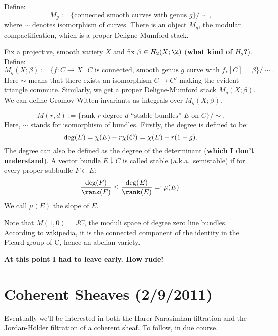 \documentclass[11pt]{article}
\newcommand{\NewLecture}[3]{\section{#1 {\small(#2/#3/2011)}}}
\begin{document}
\begin{exmp*}
Define:
\[M_g:=\{\text{connected smooth curves with genus $g$}\}/\sim,\]
where $\sim$ denotes isomorphism of curves. There is an object $\overline{M_g}$,
the modular compactification, which is a proper Deligne-Mumford stack.
\end{exmp*}
\begin{exmp*}
Fix a projective, smooth variety $X$ and fix $\beta\in H_2(X;\Z)$ (\textbf{what
kind of $H_2$?}). Define:
\[M_g(X;\beta):=\{f:C\to X\ |\ \text{$C$ is connected, smooth genus $g$ curve
with $f_*[C]=\beta$}\}/\sim.\]
Here $\sim$ means that there exists an isomorphism $C\to C'$ making the evident
triangle commute. Similarly, we get a proper Deligne-Mumford stack
$\overline{M_g(X;\beta)}$. We can define Gromov-Witten invariants as integrals
over $\overline{M_g(X;\beta)}$.
\end{exmp*}
\begin{exmp*}
\[M(r,d):=\{\text{rank $r$ degree $d$ ``stable bundles'' $E$ on $C$}\}/\sim.\]
Here, $\sim$ stands for isomorphism of bundles. Firstly, the degree is defined
to be:
\[\deg(E)=\chi(E)-r\chi(\mathcal{O})=\chi(E)-r(1-g).\]
The degree can also be defined as the degree of the determinant (\textbf{which I
don't understand}). A vector bundle $E\downarrow C$ is called stable (a.k.a.\
semistable) if for every proper subbudle $F\subset E$:
\[\frac{\deg(F)}{\rank(F)}\leq\frac{\deg(E)}{\rank(E)}=:\mu(E).\]
We call $\mu(E)$ the slope of $E$.

Note that $M(1,0)=JC$, the moduli space of degree zero line bundles. According
to wikipedia, it is the connected component of the identity in the Picard group
of C, hence an abelian variety.

\textbf{At this point I had to leave early. How rude!}
\end{exmp*}
\NewLecture{Coherent Sheaves}{2}{9}
Eventually we'll be interested in both the Harer-Narasimhan filtration and the
Jordan-H\"older filtration of a coherent sheaf. To follow, in due course.
\end{document}
